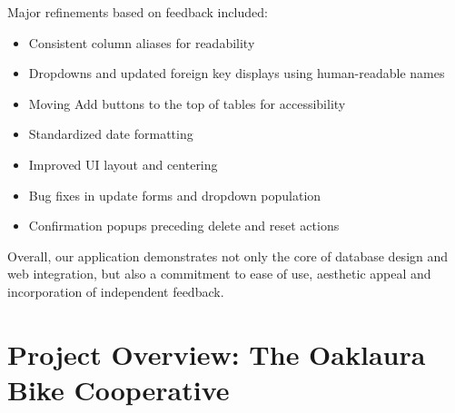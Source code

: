 \documentclass{article}
\begin{document}
\begin{tcolorbox}[colback=secondarycolor, colframe=primarycolor, title=\textbf{Reflection on Major Changes Throughout Project}]
Major refinements based on feedback included:
\vspace{0.1cm}
\begin{itemize}
    \item Consistent column aliases for readability
    \item Dropdowns and updated foreign key displays using human-readable names
    \item Moving Add buttons to the top of tables for accessibility
    \item Standardized date formatting
    \item Improved UI layout and centering
    \item Bug fixes in update forms and dropdown population
    \item Confirmation popups preceding delete and reset actions
\end{itemize}

\vspace{0.2cm}

Overall, our application demonstrates not only the core of database design and web integration, but also a commitment to ease of use, aesthetic appeal and incorporation of independent feedback.
\end{tcolorbox}

\section{Project Overview: The Oaklaura Bike Cooperative}
\end{document}

